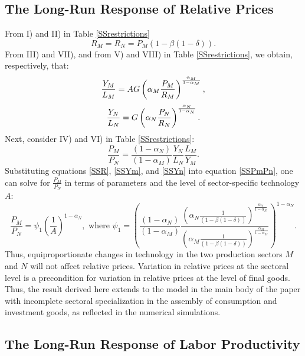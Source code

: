\documentclass[12pt,fleqn]{article}
\begin{document}
\subsection{The Long-Run Response of Relative Prices}

From I) and II) in Table \ref{SSrestrictions}
\begin{equation}
R_{M}=R_{N}=P_{M}\left( 1-\beta (1-\delta )\right) .  \label{SSR}
\end{equation}%
From III) and VII), and from V) and VIII) in Table
\ref{SSrestrictions}, we obtain, respectively, that:
\begin{equation}
\frac{Y_{M}}{L_{M}}=AG\left( \alpha _{M}\frac{P_{M}}{R_{M}}\right) ^{%
\frac{\alpha _{M}}{1-\alpha _{M}}},  \label{SSYm}
\end{equation}%
\begin{equation}
\frac{Y_{N}}{L_{N}}=G\left( \alpha _{N}\frac{P_{N}}{R_{N}}\right) ^{%
\frac{\alpha _{N}}{1-\alpha _{N}}}.  \label{SSYn}
\end{equation}%
Next, consider IV) and VI) in Table \ref{SSrestrictions}:
\begin{equation}
\frac{P_{M}}{P_{N}}=\frac{(1-\alpha _{N})}{(1-\alpha _{M})}\frac{Y_{N}}{L_{N}%
}\frac{L_{M}}{Y_{M}}.  \label{SSPmPn}
\end{equation}%
Substituting equations \ref{SSR}, \ref{SSYm}, and \ref{SSYn} into equation %
\ref{SSPmPn}, one can solve for $\frac{P_{M}}{P_{N}}$ in terms of
parameters and the level of sector-specific technology $A$:
\begin{equation}
\frac{P_{M}}{P_{N}}=\psi _{1}\left( \frac{1}{A}\right) ^{1-\alpha
_{N}},\text{ \ where }\psi _{1}=\left( \frac{(1-\alpha _{N})}{(1-\alpha _{M})%
}\frac{\left( \alpha _{N}\frac{1}{\left( 1-\beta (1-\delta )\right)
}\right) ^{\frac{\alpha _{N}}{1-\alpha _{N}}}}{\left( \alpha
_{M}\frac{1}{\left(
1-\beta (1-\delta )\right) }\right) ^{\frac{\alpha _{M}}{1-\alpha _{M}}}}%
\right) ^{1-\alpha _{N}}.  \label{SSRelprice}
\end{equation}%
Thus, equiproportionate changes in technology in the two production sectors $%
M$ and $N$ will not affect relative prices. Variation in relative
prices at the sectoral level is a precondition for variation in
relative prices at the level of final goods. Thus, the result
derived here extends to the model in the main body of the paper with
incomplete sectoral specialization in the assembly of consumption
and investment goods, as reflected in the numerical simulations.

\subsection{The Long-Run Response of Labor Productivity}
\end{document}
